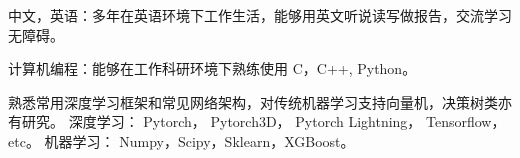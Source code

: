 \begin{cvparagraph}

中文，英语：多年在英语环境下工作生活，能够用英文听说读写做报告，交流学习无障碍。

计算机编程：能够在工作科研环境下熟练使用 C，C++, Python。

熟悉常用深度学习框架和常见网络架构，对传统机器学习支持向量机，决策树类亦有研究。
深度学习： Pytorch， Pytorch3D， Pytorch Lightning， Tensorflow，etc。
机器学习： Numpy，Scipy，Sklearn，XGBoost。
\end{cvparagraph}

